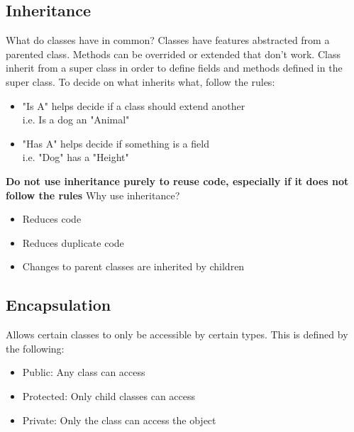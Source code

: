 \documentclass[a4paper, 11pt]{article}
\begin{document}
    \subsection{Inheritance}
        What do classes have in common?  Classes have features abstracted from a parented class.  Methods can be overrided or extended that don't work.
        \newline\newline
        Class inherit from a super class in order to define fields and methods defined in the super class.
        \newline\newline
        To decide on what inherits what, follow the rules:
        \begin{itemize}
            \item "Is A" helps decide if a class should extend another\\
                i.e. Is a dog an "Animal"
            \item "Has A" helps decide if something is a field\\
                i.e. "Dog" has a "Height"
        \end{itemize}
        \textbf{Do not use inheritance purely to reuse code, especially if it does not follow the rules}
        \newline\newline
        Why use inheritance?
        \begin{itemize}
            \item Reduces code
            \item Reduces duplicate code
            \item Changes to parent classes are inherited by children
        \end{itemize}

    \subsection{Encapsulation}
        Allows certain classes to only be accessible by certain types.  This is defined by the following:
        \begin{itemize}
            \item Public: Any class can access
            \item Protected: Only child classes can access
            \item Private: Only the class can access the object
        \end{itemize}
\end{document}
